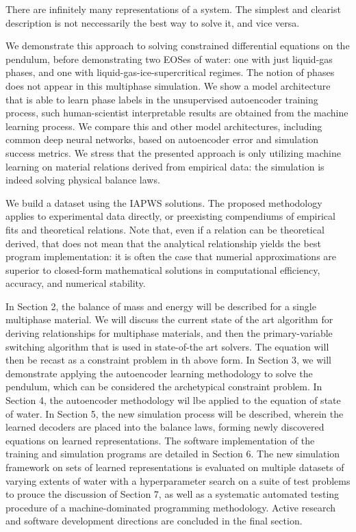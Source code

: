 \documentclass[AMA,STIX1COL]{WileyNJD-v2}
\begin{document}
There are infinitely many representations of a system. The simplest and clearist description is not neccessarily the best way
to solve it, and vice versa.


We demonstrate this approach to solving constrained differential
equations on the pendulum, before demonstrating two EOSes of water: one
with just liquid-gas phases, and one with liquid-gas-ice-supercritical
regimes. The notion of phases does not appear in this multiphase
simulation. We show a model architecture that is able to learn phase
labels in the unsupervised autoencoder training process, such
human-scientist interpretable results are obtained from the machine
learning process. We compare this and other model architectures,
including common deep neural networks, based on autoencoder error and
simulation success metrics. We stress that the presented approach is
only utilizing machine learning on material relations derived from
empirical data: the simulation is indeed solving physical balance laws.

We build a dataset using the IAPWS solutions. The proposed
methodology applies to experimental data directly, or preexisting
compendiums of empirical fits and theoretical relations.
Note that, even if a relation can be theoretical derived, that does
not mean that the analytical relationship yields the best program
implementation: it is often the case that numerial approximations are
superior to closed-form mathematical solutions in computational
efficiency, accuracy, and numerical stability.

In Section 2, the balance of mass and energy will be described for a
single multiphase material. We will discuss the current state of the
art algorithm for deriving relationships for multiphase materials, and
then the primary-variable switching algorithm that is used in
state-of-the art solvers. The equation will then be recast as a
constraint problem in th above form.
In Section 3, we will demonstrate applying the autoencoder learning
methodology to solve the pendulum,
which can be considered the archetypical constraint problem.
In Section 4, the autoencoder methodology wil lbe applied to the
equation of state of water. In Section 5, the new simulation process
will be described, wherein the learned decoders are placed into the
balance laws, forming newly discovered equations on learned
representations. The software implementation of the training and
simulation programs are detailed in Section 6. The new simulation
framework on sets of learned representations is evaluated on
multiple datasets of varying extents of water with a
hyperparameter search on a suite of test problems to prouce the discussion of Section 7, as
well as a systematic automated testing procedure of a
machine-dominated programming methodology.
Active research and software development directions are
concluded in the final section.
\end{document}
